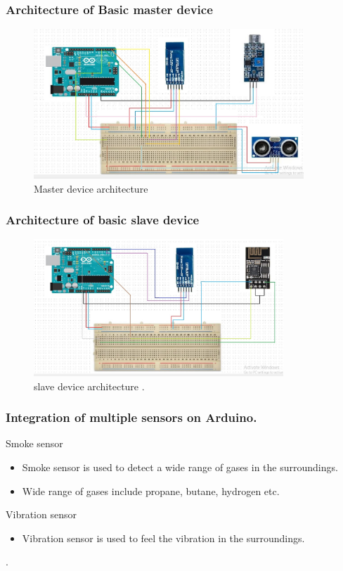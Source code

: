 \documentclass{beamer}
\begin{document}
\begin{frame}\frametitle{Architecture of Basic master device}
\begin{itemize}
  \begin{figure}[H]
  \centerline{\includegraphics[width=4.0in]{master.JPG}}
  \caption{ \textbf{}Master device architecture}
  \end{figure}
\end{itemize}
\end{frame}
\begin{frame}\frametitle{Architecture of basic slave device }
\begin{itemize}
\begin{figure}[h]
\centerline{\includegraphics[width=3.7in]{slave}}
\caption{slave device architecture  .}
\end{figure}
\end{itemize}
\end{frame}
  \begin{frame}\frametitle{Integration of multiple sensors on Arduino.}
 \item Smoke  sensor
\begin{itemize}
\item Smoke sensor is used to detect a wide range of gases in the surroundings.
\item Wide range of gases include propane, butane, hydrogen etc.
\end{itemize}
 \item Vibration sensor
\begin{itemize}
    \item Vibration sensor is used to feel the vibration in the surroundings. 
\end{itemize}
.

\end{frame}
\end{document}

